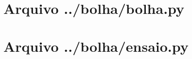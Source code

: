 \documentclass[12pt,a4paper,twoside]{report}
\begin{document}
\clearpage
\clearpage
{}
\appendix

\chapter{Arquivo ../bolha/bolha.py \label{ap:bolha}}


\chapter{Arquivo ../bolha/ensaio.py \label{ap:bolhaensaio}}

\end{document}
